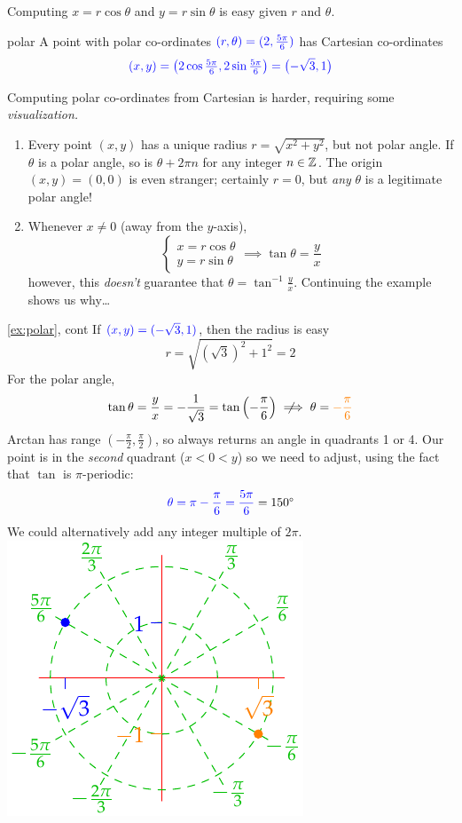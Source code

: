 Computing $x=r\cos\theta$ and $y=r\sin\theta$ is easy given $r$ and $\theta$.

\begin{example}{}{polar}
	A point with polar co-ordinates $\textcolor{blue}{(r,\theta)=(2,\frac{5\pi}6)}$ has Cartesian co-ordinates
	\[
		\textcolor{blue}{(x,y)
		=\bigl(2\cos\tfrac{5\pi}6,2\sin\tfrac{5\pi}6\bigr)
		=\bigl(-\sqrt 3,1\bigr)}
	\]
\end{example}

Computing polar co-ordinates from Cartesian is harder, requiring some \emph{visualization.}  
\begin{enumerate}
  \item Every point $(x,y)$ has a unique radius $r=\sqrt{x^2+y^2}$, but not polar angle. If $\theta$ is a polar angle, so is $\theta+2\pi n$ for any integer $n\in\Z$. The origin $(x,y)=(0,0)$ is even stranger; certainly $r=0$, but \emph{any} $\theta$ is a legitimate polar angle!
  \item Whenever $x\neq 0$ (away from the $y$-axis),
  \[
  	\begin{cases}
  		x=r\cos\theta\\
  		y=r\sin\theta
  	\end{cases}
  	\implies \tan\theta=\frac yx
  \]
	however, this \emph{doesn't} guarantee that $\theta=\tan^{-1}\frac yx$. Continuing the example shows us why\ldots
\end{enumerate}

\begin{example*}[lower separated=false, sidebyside, sidebyside align=top seam, sidebyside gap=0pt, righthand width=0.35\linewidth]{\ref{ex:polar}, cont}{}
	If $\textcolor{blue}{(x,y)=(-\sqrt 3,1)}$, then the radius is easy
	\[
		r=\sqrt{(\sqrt 3)^2+1^2}=2
	\]
	For the polar angle,
	\[
		\tan\theta =\frac yx =-\frac 1{\sqrt 3}
		=\tan\left(-\frac\pi 6\right)\notimplies \theta=\textcolor{orange}{-\frac\pi 6}
	\]
	Arctan has range $(-\frac\pi 2,\frac\pi 2)$, so always returns an angle in quadrants 1 or 4. Our point is in the \emph{second} quadrant ($x<0<y$) so we need to adjust, using the fact that $\tan$ is $\pi$-periodic:
	\[
		\textcolor{blue}{\theta=\pi-\frac\pi 6=\frac{5\pi}6} =\ang{150}
	\]
	We could alternatively add any integer multiple of $2\pi$.
	\tcblower
	\flushright\includegraphics{expolar}
\end{example*}


